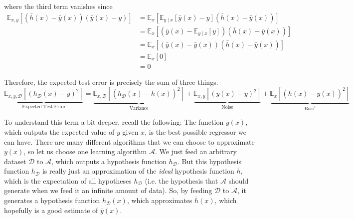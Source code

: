   where the third term vanishes since
  \begin{align*}
    \mathbb{E}_{x, y} \left[\left(\bar{h}(x) - \bar{y}(x)\right)\left(\bar{y}(x) - y\right)\right] 
    &= \mathbb{E}_{x}\left[\mathbb{E}_{y \mid x} \left[\bar{y}(x) - y \right] \left(\bar{h}(x) - \bar{y}(x) \right) \right] \\
    &= \mathbb{E}_{x} \left[ \left( \bar{y}(x) - \mathbb{E}_{y \mid x} \left [ y \right]\right) \left(\bar{h}(x) - \bar{y}(x)\right)\right] \\
    &= \mathbb{E}_{x} \left[ \left( \bar{y}(x) - \bar{y}(x) \right) \left(\bar{h}(x) - \bar{y}(x)\right)\right] \\
    &= \mathbb{E}_{x} \left[ 0 \right] \\
    &= 0
  \end{align*}

  Therefore, the expected test error is precisely the sum of three things.
  \begin{equation*}
    \underbrace{\mathbb{E}_{x, y, \mathcal{D}} \left[\left(h_{\mathcal{D}}(x) - y\right)^{2}\right]}_\mathrm{Expected\;Test\;Error} = \underbrace{\mathbb{E}_{x, \mathcal{D}}\left[\left(h_{\mathcal{D}}(x) - \bar{h}(x)\right)^{2}\right]}_\mathrm{Variance} + \underbrace{\mathbb{E}_{x, y}\left[\left(\bar{y}(x) - y\right)^{2}\right]}_\mathrm{Noise} + \underbrace{\mathbb{E}_{x}\left[\left(\bar{h}(x) - \bar{y}(x)\right)^{2}\right]}_\mathrm{Bias^2}
  \end{equation*}

  To understand this term a bit deeper, recall the following: The function $\overline{y}(x)$, which outputs the expected value of $y$ given $x$, is the best possible regressor we can have. There are many different algorithms that we can choose to approximate $\overline{y}(x)$, so let us choose one learning algorithm $\mathcal{A}$. We just feed an arbitrary dataset $\mathcal{D}$ to $\mathcal{A}$, which outputs a hypothesis function $h_\mathcal{D}$. But this hypothesis function $h_\mathcal{D}$ is really just an approximation of the \textit{ideal} hypothesis function $\overline{h}$, which is the expectation of all hypotheses $h_\mathcal{D}$ (i.e. the hypothesis that $\mathcal{A}$ should generate when we feed it an infinite amount of data). So, by feeding $\mathcal{D}$ to $\mathcal{A}$, it generates a hypothesis function $h_\mathcal{D}(x)$, which approximates $\overline{h}(x)$, which hopefully is a good estimate of $\overline{y}(x)$.

